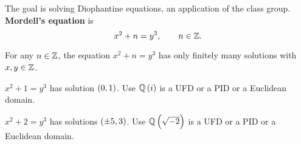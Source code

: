 
The goal is solving Diophantine equations, an application of the class group. \textbf{Mordell's equation} is
$$ x^2 + n = y^3, \qquad n \in \mathbb{Z}. $$

\begin{theorem}
For any $ n \in \mathbb{Z} $, the equation $ x^2 + n = y^3 $ has only finitely many solutions with $ x, y \in \mathbb{Z} $.
\end{theorem}

\begin{example*}
$ x^2 + 1 = y^3 $ has solution $ \br{0, 1} $. Use $ \QQ\br{i} $ is a UFD or a PID or a Euclidean domain.
\end{example*}

\begin{example*}
$ x^2 + 2 = y^3 $ has solutions $ \br{\pm 5, 3} $. Use $ \QQ\br{\sqrt{-2}} $ is a UFD or a PID or a Euclidean domain.
\end{example*}

